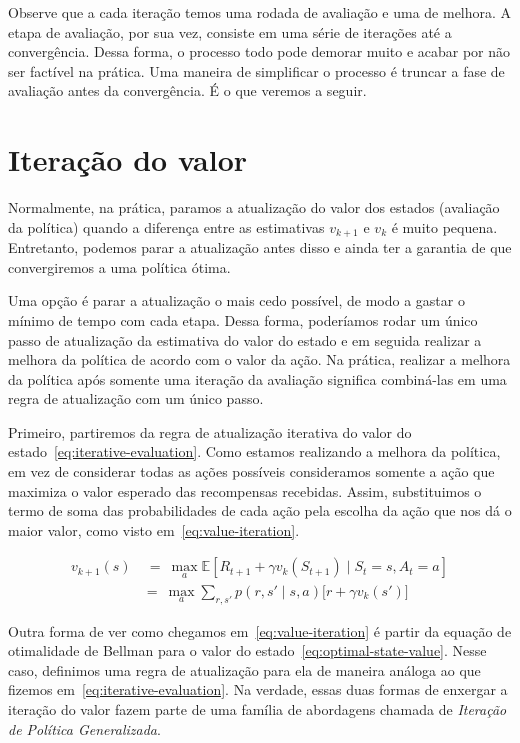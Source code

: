 \documentclass{article}
\begin{document}
        Observe que a cada iteração temos uma rodada de avaliação e uma de melhora. A etapa de avaliação, por sua vez, consiste em uma série de iterações até a convergência. Dessa forma, o processo todo pode demorar muito e acabar por não ser factível na prática. Uma maneira de simplificar o processo é truncar a fase de avaliação antes da convergência. É o que veremos a seguir.

    \section{Iteração do valor}

        Normalmente, na prática, paramos a atualização do valor dos estados (avaliação da política) quando a diferença entre as estimativas $v_{k+1}$ e $v_k$ é muito pequena. Entretanto, podemos parar a atualização antes disso e ainda ter a garantia de que convergiremos a uma política ótima.

        Uma opção é parar a atualização o mais cedo possível, de modo a gastar o mínimo de tempo com cada etapa. Dessa forma, poderíamos rodar um único passo de atualização da estimativa do valor do estado e em seguida realizar a melhora da política de acordo com o valor da ação. Na prática, realizar a melhora da política após somente uma iteração da avaliação significa combiná-las em uma regra de atualização com um único passo.

        Primeiro, partiremos da regra de atualização iterativa do valor do estado~\eqref{eq:iterative-evaluation}. Como estamos realizando a melhora da política, em vez de considerar todas as ações possíveis consideramos somente a ação que maximiza o valor esperado das recompensas recebidas. Assim, substituimos o termo de soma das probabilidades de cada ação pela escolha da ação que nos dá o maior valor, como visto em~\eqref{eq:value-iteration}.
        
        \begin{equation}
            \begin{aligned}
                v_{k+1}(s) & \ = \ \max_a \mathbb{E}[R_{t+1} + \gamma v_k(S_{t+1}) \mid S_t = s, A_t = a] \\
                & = \ \max_a \sum_{r, s'} p(r, s' \mid s, a) \Big[ r + \gamma v_k(s') \Big]
            \end{aligned}
            \label{eq:value-iteration}
        \end{equation}
        
        Outra forma de ver como chegamos em~\eqref{eq:value-iteration} é partir da equação de otimalidade de Bellman para o valor do estado~\eqref{eq:optimal-state-value}. Nesse caso, definimos uma regra de atualização para ela de maneira análoga ao que fizemos em~\eqref{eq:iterative-evaluation}. Na verdade, essas duas formas de enxergar a iteração do valor fazem parte de uma família de abordagens chamada de \emph{Iteração de Política Generalizada}.
    
\end{document}
